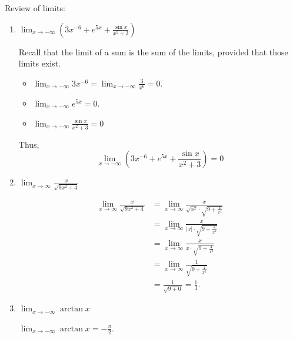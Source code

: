\documentclass[noinstructornotes]{ximera}
\begin{document}
\begin{problem}
Review of limits:
	\begin{enumerate}
	
	\item  $\lim_{x \to -\infty} \left( 3x^{-6} + e^{5x} + \frac{\sin x}{x^2 + 3} \right)$
	\begin{freeResponse}
	Recall that the limit of a sum is the sum of the limits, provided that those limits exist.
		\begin{itemize}
		\item  $\lim_{x \to -\infty} 3x^{-6} = \lim_{x \to -\infty} \frac{3}{x^6} = 0$.
		\item  $\lim_{x \to -\infty} e^{5x} = 0$.
		\item  $\lim_{x \to -\infty} \frac{\sin x}{x^2 + 3} = 0$  
		
		\vspace{8pt}
		
		{\color{red} }
		\end{itemize}
	Thus, 
		\[
		\lim_{x \to -\infty} \left( 3x^{-6} + e^{5x} + \frac{\sin x}{x^2 + 3} \right) = 0
		\]
	\end{freeResponse}
	
	
	
	\item  $\lim_{x \to \infty} \frac{x}{\sqrt{9x^2+4}}$
	\begin{freeResponse}
		\begin{align*}
		\lim_{x \to \infty} \frac{x}{\sqrt{9x^2+4}}
		&= \lim_{x \to \infty} \frac{x}{\sqrt{x^2} \cdot {\sqrt{9 + \frac{4}{x^2}}}}  \\
		&= \lim_{x \to \infty} \frac{x}{|x| \cdot \sqrt{9 + \frac{4}{x^2}}}  \\
		&= \lim_{x \to \infty} \frac{x}{x \cdot \sqrt{9 + \frac{4}{x^2}}}  \\
		&= \lim_{x \to \infty} \frac{1}{\sqrt{9 + \frac{4}{x^2}}}  \\
		&= \frac{1}{\sqrt{9 + 0}} = \frac{1}{3}.
		\end{align*}
	\end{freeResponse}
	
	
	
	\item  $\lim_{x \to -\infty} \arctan x$
	\begin{freeResponse}
	$\lim_{x \to -\infty} \arctan x = - \frac{\pi}{2}. $
	\end{freeResponse}
	
	\end{enumerate}
		
\end{problem}
\end{document}
